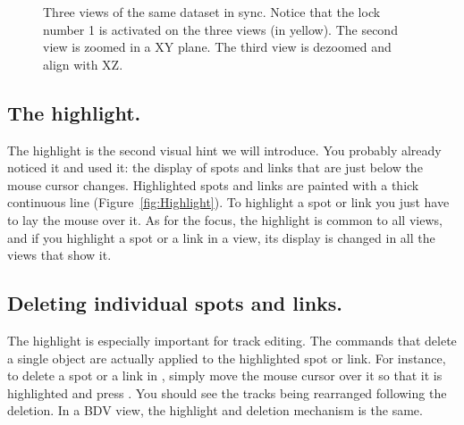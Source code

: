 \begin{figure}
    \caption{Three views of the same dataset in sync. Notice that the lock number 1 is activated on the three views (in yellow). The second view is zoomed in a XY plane. The third view is dezoomed and align with XZ.}
    \label{fig:ViewsInSync}
\end{figure}  


\subsection{The highlight.}

The highlight is the second visual hint we will introduce. 
You probably already noticed it and used it: the display of spots and links that are just below the mouse cursor changes.
Highlighted spots and links are painted with a thick continuous line (Figure~\ref{fig:Highlight}). 
To highlight a spot or link you just have to lay the mouse over it.
As for the focus, the highlight is common to all views, and if you highlight a spot or a link in a view, its display is changed in all the views that show it.


\subsection{Deleting individual spots and links.}

The highlight is especially important for track editing. 
The commands that delete a single object are actually applied to the highlighted spot or link.
For instance, to delete a spot or a link in \TrackScheme, simply move the mouse cursor over it so that it is highlighted and press .
You should see the tracks being rearranged following the deletion. 
In a BDV view, the highlight and deletion mechanism is the same. 


